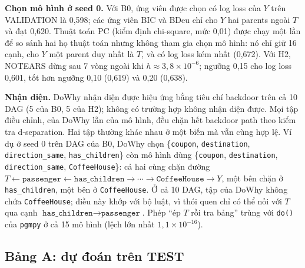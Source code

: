 \documentclass[pdflatex,sn-mathphys-num]{sn-jnl}%
\newcommand{\var}[1]{\texttt{#1}}                 %
\begin{document}
\textbf{Chọn mô hình ở seed 0.} Với B0, ứng viên được chọn có log loss của $Y$ trên VALIDATION là 0,598; các ứng viên BIC và BDeu chỉ cho $Y$ hai parents ngoài $T$ và đạt 0,620. Thuật toán PC (kiểm định chi-square, mức 0,01) được chạy một lần để so sánh hai họ thuật toán nhưng không tham gia chọn mô hình: nó chỉ giữ 16 cạnh, cho $Y$ một parent duy nhất là $T$, và có log loss kém nhất (0,672). Với H2, NOTEARS dừng sau 7 vòng ngoài khi $h \approx 3{,}8\times10^{-6}$; ngưỡng 0,15 cho log loss 0,601, tốt hơn ngưỡng 0,10 (0,619) và 0,20 (0,638).

\textbf{Nhận diện.} DoWhy nhận diện được hiệu ứng bằng tiêu chí backdoor trên cả 10 DAG (5 của B0, 5 của H2); không có trường hợp không nhận diện được. Mọi tập điều chỉnh, của DoWhy lẫn của mô hình, đều chặn hết backdoor path theo kiểm tra d-separation. Hai tập thường khác nhau ở một biến mà vẫn cùng hợp lệ. Ví dụ ở seed 0 trên DAG của B0, DoWhy chọn \{\var{coupon}, \var{destination}, \var{direction\_same}, \var{has\_children}\} còn mô hình dùng \{\var{coupon}, \var{destination}, \var{direction\_same}, \var{CoffeeHouse}\}: cả hai cùng chặn đường $T \leftarrow \var{passenger} \leftarrow \var{has\_children} \to \cdots \to \var{CoffeeHouse} \to Y$, một bên chặn ở \var{has\_children}, một bên ở \var{CoffeeHouse}. Ở cả 10 DAG, tập của DoWhy không chứa \var{CoffeeHouse}; điều này khớp với bộ luật, vì thói quen chỉ có thể nối với $T$ qua cạnh $\var{has\_children} \to \var{passenger}$. Phép ``ép $T$ rồi tra bảng'' trùng với \texttt{do()} của \texttt{pgmpy} ở cả 15 mô hình (lệch lớn nhất $1{,}1\times10^{-16}$).

\subsection{Bảng A: dự đoán trên TEST}\label{sec:tableA}
\end{document}
